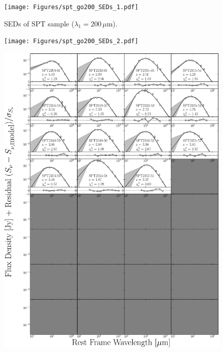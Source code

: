 \begin{figure}
	\centering
	\caption[SEDs of SPT sample ($\lambda_1 = 200\,\mu$m)]{SEDs of SPT sample ($\lambda_1 = 200\,\mu$m).}
	\texttt{[image: Figures/spt\_go200\_SEDs\_1.pdf]}
\end{figure}
\begin{figure}
	\centering
	\texttt{[image: Figures/spt\_go200\_SEDs\_2.pdf]}
\end{figure}
\begin{figure}
	\centering
	\includegraphics[width=\columnwidth]{Figures/spt_go200_SEDs_3.pdf}
\end{figure}
